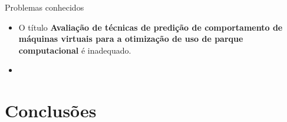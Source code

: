 \documentclass{beamer}
\begin{document}
\begin{frame}{Problemas conhecidos}
\begin{itemize}
  \item O título \textbf{Avaliação de técnicas de predição de comportamento
        de máquinas virtuais para a otimização de uso de parque computacional} é
        inadequado.
  \item 
\end{itemize}
\end{frame}

\section{Conclusões}
\end{document}
